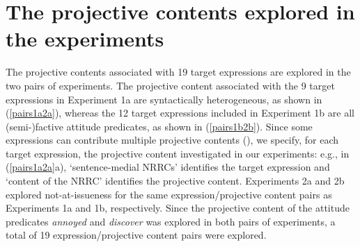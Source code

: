 \documentclass[11pt,fleqn]{article}
\newcommand{\6}{\mbox{$[\hspace*{-.6mm}[$}}
\newcommand{\9}{\mbox{$]\hspace*{-.6mm}]$}}
\begin{document}
\section{The projective contents explored in the experiments}\label{s2}

The projective contents associated with 19 target expressions are explored in the two pairs of experiments. The projective content associated with the 9 target expressions in Experiment 1a are syntactically heterogeneous, as shown in (\ref{pairs1a2a}), whereas the 12 target expressions included in Experiment 1b are all (semi-)factive attitude predicates, as shown in (\ref{pairs1b2b}). Since some expressions can contribute multiple projective contents (\citealt{brst-lang11}), we specify, for each target expression, the projective content investigated in our experiments: e.g., in (\ref{pairs1a2a}a), `sentence-medial NRRCs' identifies the target expression and `content of the NRRC' identifies the projective content. Experiments 2a and 2b explored not-at-issueness for the same expression/projective content pairs as Experiments 1a and 1b, respectively. Since the projective content of the attitude predicates {\em annoyed} and {\em discover} was explored in both pairs of experiments, a total of 19 expression/projective content pairs were explored. 
\end{document}
